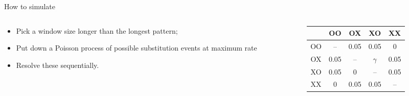 \documentclass[smaller]{beamer}
\begin{document}
\begin{frame}{How to simulate}
  \begin{columns}[c]
    \begin{column}{.5\textwidth}

  \begin{itemize}

    \item Pick a window size longer than the longest pattern; 

    \item Put down a Poisson process of {\newthing possible} substitution events at maximum rate

    \item Resolve these sequentially.

  \end{itemize}
    \end{column}
    \begin{column}{.5\textwidth}

      \begin{tabular}{c|cccc}
        & OO & OX & XO & XX \\
        \hline
        OO & -- & 0.05 & 0.05 & 0 \\
        OX & 0.05 & -- & $\gamma$ & 0.05 \\
        XO & 0.05 & 0 & -- & 0.05 \\
        XX & 0 & 0.05 & 0.05 & --
      \end{tabular}

    \end{column}
  \end{columns}


\end{frame}
\end{document}
